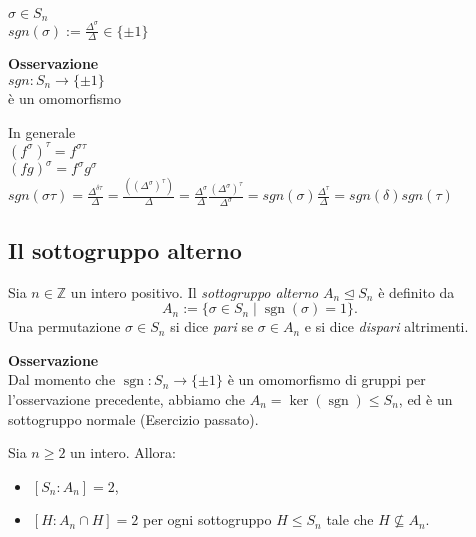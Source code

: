 \documentclass[12px]{article}
\begin{document}
{\begin{nota}
	\end{nota}
	\begin{defi}
		$\sigma\in S_n$\\
		$sgn(\sigma) := \frac {\Delta^\sigma}\Delta\in\{\pm 1\}$\\
	\end{defi}
		 \textbf{Osservazione}\\
		 $sgn: S_n \rightarrow \{\pm 1\}$ \\
		 è un omomorfismo\\
		 \begin{dimo}
		 	In generale\\
			$(f^\sigma)^\tau = f^{\sigma\tau}$\\
			 $(fg)^\sigma = f^\sigma g^\sigma$\\
			 $\displaystyle sgn(\sigma\tau)=\frac {\Delta^{\delta\tau}}\Delta = \frac {((\Delta^\sigma)^\tau)} \Delta = \frac {\Delta^\sigma}{\Delta} \frac {(\Delta^\sigma)^\tau}{\Delta^\sigma} = sgn(\sigma)\frac{\Delta^\tau}\Delta = sgn(\delta)sgn(\tau)$
		 \end{dimo}
		 \subsection{Il sottogruppo alterno}

\begin{defi}
Sia $n \in \mathbb{Z}$ un intero positivo. Il \emph{sottogruppo alterno} $A_n \trianglelefteq S_n$ è definito da
\[
A_n := \{\sigma \in S_n \mid \operatorname{sgn}(\sigma) = 1 \}.
\]
Una permutazione $\sigma \in S_n$ si dice \emph{pari} se $\sigma \in A_n$ e si dice \emph{dispari} altrimenti.
\end{defi}
\textbf{Osservazione}\\
Dal momento che $\operatorname{sgn}: S_n \to \{\pm 1\}$ è un omomorfismo di gruppi per l'osservazione precedente,
abbiamo che $A_n = \ker(\operatorname{sgn}) \leq S_n$, ed è un sottogruppo normale (Esercizio passato).

\begin{prop}
Sia $n \geq 2$ un intero. Allora:
\begin{itemize}
    \item $[S_n : A_n] = 2$,
    \item $[H : A_n \cap H] = 2$ per ogni sottogruppo $H \leq S_n$ tale che $H \not\subseteq A_n$.
\end{itemize}
\end{prop}

}
\end{document}
